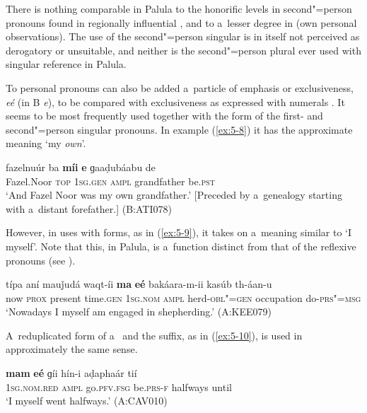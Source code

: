 There is nothing comparable in Palula to the honorific levels in second"=person pronouns found in regionally influential \iliUrdu \citep[17]{schmidt1999}, and to a~lesser degree in \iliPashto (own personal observations). The use of the second"=person singular is in itself not perceived as derogatory or unsuitable, and neither is the second"=person plural  ever used with singular reference in Palula.

To personal pronouns can also be added a~particle of emphasis or exclusiveness, \textit{eé} (in B \textit{e}), to be compared with exclusiveness as expressed with numerals . It seems to be most frequently used together with the  form of the first- and second"=person singular pronouns. In example (\ref{ex:5-8}) it has the approximate meaning `my \textit{own}'.



\begin{exe}
\ex
\label{ex:5-8}
\gll fazelnuúr ba \textbf{míi} \textbf{e} ɡaaḍubáabu de \\
	Fazel.Noor \textsc{top} \textsc{1sg.gen} \textsc{ampl} grandfather be.\textsc{pst} \\
\glt `And Fazel Noor was my own grandfather.' [Preceded by a~genealogy starting with a~distant forefather.] (B:ATI078)
\end{exe}

However, in uses with   forms, as in (\ref{ex:5-9}), it takes on a~meaning similar to `I myself'. Note that this, in Palula, is a~function distinct from that of the reflexive pronouns (see ).

\begin{exe}
\ex
\label{ex:5-9}
\gll típa aní mauǰudá waqt-íi \textbf{ma} \textbf{eé} bakáara-m-ii kasúb th-áan-u\\
	now \textsc{prox} present time.\textsc{gen} \textsc{1sg.nom} \textsc{ampl} herd-\textsc{obl"=gen} occupation do-\textsc{prs"=msg}\\
\glt `Nowadays I myself am engaged in shepherding.' (A:KEE079)
\end{exe}


A~reduplicated form of a~ and the suffix, as in (\ref{ex:5-10}), is used in approximately the same sense.


\begin{exe}
\ex
\label{ex:5-10}
\gll \textbf{mam} \textbf{eé} ɡíi hín-i aḍaphaár tií\\
\textsc{1sg.nom.red} \textsc{ampl} go.\textsc{pfv.fsg} be.\textsc{prs-f} halfways until \\
\glt `I myself went halfways.' (A:CAV010)
\end{exe}

